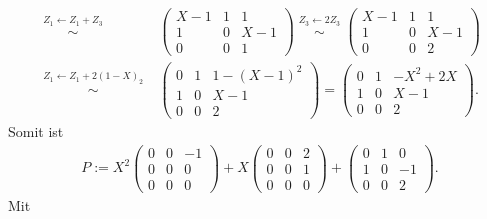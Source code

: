 \documentclass[../../main.tex]{subfiles}
\begin{document}
\begin{bsp}
\begin{align*}
        \stackrel{\begin{smallmatrix}Z_1\leftarrow Z_1+Z_3\end{smallmatrix}}{\sim}&\begin{pmatrix}X-1&1&1\\1&0&X-1\\0&0&1\end{pmatrix}\stackrel{\begin{smallmatrix}Z_3\leftarrow 2Z_3\end{smallmatrix}}{\sim}\begin{pmatrix}X-1&1&1\\1&0&X-1\\0&0&2\end{pmatrix}\\
        \stackrel{\begin{smallmatrix}Z_1\leftarrow Z_1+2(1-X)_2\end{smallmatrix}}{\sim}&\begin{pmatrix}0&1&1-(X-1)^2\\1&0&X-1\\0&0&2\end{pmatrix}=\begin{pmatrix}0&1&-X^2+2X\\1&0&X-1\\0&0&2\end{pmatrix}.
    \end{align*}
    Somit ist
    \begin{align*}
        P:=X^2\begin{pmatrix}0&0&-1\\0&0&0\\0&0&0\end{pmatrix}+X\begin{pmatrix}0&0&2\\0&0&1\\0&0&0\end{pmatrix}+\begin{pmatrix}0&1&0\\1&0&-1\\0&0&2\end{pmatrix}.
    \end{align*}
    Mit
    \begin{align*}

\end{align*}
\end{bsp}
\end{document}
